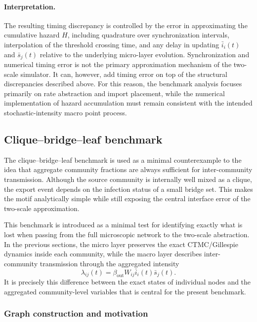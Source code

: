 \documentclass[a4paper,fleqn]{cas-sc}
\newcommand{\ReadStatusTwo}[5]{}
\begin{document}
\paragraph{Interpretation.}
The resulting timing discrepancy is controlled by the error in approximating the cumulative hazard \(H\), including quadrature over synchronization intervals, interpolation of the threshold crossing time, and any delay in updating \(\bar{i}_i(t)\) and \(\bar{s}_j(t)\) relative to the underlying micro-layer evolution. Synchronization and numerical timing error is not the primary approximation mechanism of the two-scale simulator. It can, however, add timing error on top of the structural discrepancies described above. For this reason, the benchmark analysis focuses primarily on rate abstraction and import placement, while the numerical implementation of hazard accumulation must remain consistent with the intended stochastic-intensity macro point process.


\subsection{Clique--bridge--leaf benchmark}
\ReadStatusTwo{Clique--bridge--leaf benchmark}{Yulian}{1}{Michael}{0}
The clique--bridge--leaf benchmark is used as a minimal counterexample to the idea that aggregate community fractions are always sufficient for inter-community transmission. 
Although the source community is internally well mixed as a clique, the export event depends on the infection status of a small bridge set. 
This makes the motif analytically simple while still exposing the central interface error of the two-scale approximation.

This benchmark is introduced as a minimal test for identifying exactly what is lost when passing from the full microscopic network to the two-scale abstraction. In the previous sections, the micro layer preserves the exact CTMC/Gillespie dynamics inside each community, while the macro layer describes inter-community transmission through the aggregated intensity
\[
\lambda_{ij}(t)=\beta_{\mathrm{out}} W_{ij}\bar{i}_i(t)\bar{s}_j(t).
\]
It is precisely this difference between the exact states of individual nodes and the aggregated community-level variables that is central for the present benchmark.

\subsubsection{Graph construction and motivation}
\ReadStatusTwo{Graph construction and motivation}{Yulian}{1}{Michael}{0}
\end{document}
